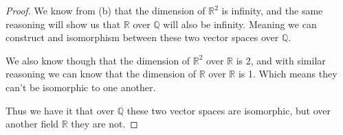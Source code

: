 \documentclass[12pt]{article}
\newcommand      {\Qm}         {{\mathbb Q}}
\newcommand      {\Rm}         {{\mathbb R}}
\begin{document}
\begin{itemize}
\begin{itemize}
\begin{proof}
            We know from (b) that the dimension of $\Rm^2$ is infinity, and the same reasoning will show us that $\Rm$ over $\Qm$ will also be infinity. Meaning we can construct and isomorphism between these two vector spaces over $\Qm$. 

            We also know though that the dimension of $\Rm^2$ over $\Rm$ is 2, and with similar reasoning we can know that the dimension of $\Rm$ over $\Rm$ is 1. Which means they can't be isomorphic to one another. 
            
            Thus we have it that over $\Qm$ these two vector spaces are isomorphic, but over another field $\Rm$ they are not.
        \end{proof} 
    \end{itemize}
\end{itemize}
\end{document}
